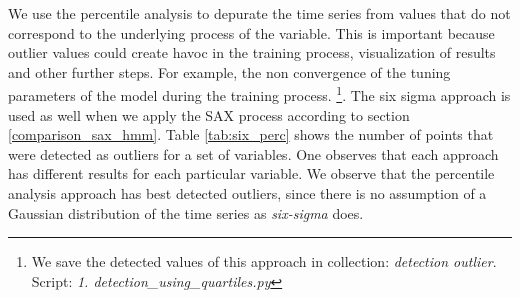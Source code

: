We use the percentile analysis to depurate the time series from values that do not correspond to the underlying process of the variable. This is important because outlier values could create havoc in the training process, visualization of results and other further steps. For example, the non convergence of the tuning parameters of the model during the training process. \footnote{We save the detected values of this approach in collection: \textit{detection outlier}. Script: \textit{1. detection\_using\_quartiles.py}}. The six sigma approach is used as well when we apply the SAX process according to section \ref{comparison_sax_hmm}. Table \ref{tab:six_perc} shows the number of points that were detected as outliers for a set of variables. One observes that each approach has different results for each particular variable. We observe that the percentile analysis approach has best detected outliers, since there is no assumption of a Gaussian distribution of the time series as \textit{six-sigma} does.       


